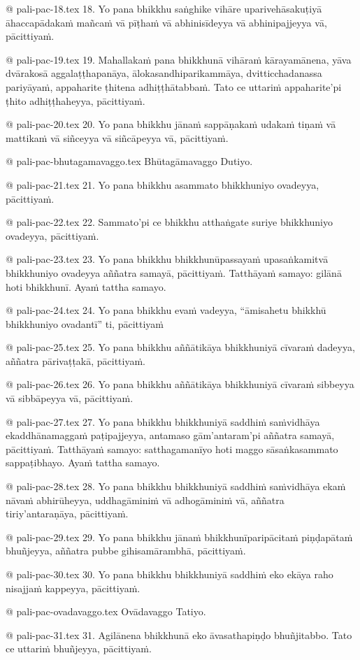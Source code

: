 @ pali-pac-18.tex
18. Yo pana bhikkhu saṅghike vihāre uparivehāsakuṭiyā āhaccapādakaṁ mañcaṁ vā pīṭhaṁ vā abhinisīdeyya vā abhinipajjeyya vā, pācittiyaṁ.

@ pali-pac-19.tex
19. Mahallakaṁ pana bhikkhunā vihāraṁ kārayamānena, yāva dvārakosā aggalaṭṭhapanāya, ālokasandhiparikammāya, dvitticchadanassa pariyāyaṁ, appaharite ṭhitena adhiṭṭhātabbaṁ. Tato ce uttariṁ appaharite’pi ṭhito adhiṭṭhaheyya, pācittiyaṁ.

@ pali-pac-20.tex
20. Yo pana bhikkhu jānaṁ sappāṇakaṁ udakaṁ tiṇaṁ vā mattikaṁ vā siñceyya vā siñcāpeyya vā, pācittiyaṁ.

@ pali-pac-bhutagamavaggo.tex
Bhūtagāmavaggo Dutiyo.

@ pali-pac-21.tex
21. Yo pana bhikkhu asammato bhikkhuniyo ovadeyya, pācittiyaṁ.

@ pali-pac-22.tex
22. Sammato’pi ce bhikkhu atthaṅgate suriye bhikkhuniyo ovadeyya, pācittiyaṁ.

@ pali-pac-23.tex
23. Yo pana bhikkhu bhikkhunūpassayaṁ upasaṅkamitvā bhikkhuniyo ovadeyya aññatra samayā, pācittiyaṁ. Tatthāyaṁ samayo: gilānā hoti bhikkhunī. Ayaṁ tattha samayo.

@ pali-pac-24.tex
24. Yo pana bhikkhu evaṁ vadeyya, “āmisahetu bhikkhū bhikkhuniyo ovadantī” ti, pācittiyaṁ

@ pali-pac-25.tex
25. Yo pana bhikkhu aññātikāya bhikkhuniyā cīvaraṁ dadeyya, aññatra pārivaṭṭakā, pācittiyaṁ.

@ pali-pac-26.tex
26. Yo pana bhikkhu aññātikāya bhikkhuniyā cīvaraṁ sibbeyya vā sibbāpeyya vā, pācittiyaṁ.

@ pali-pac-27.tex
27. Yo pana bhikkhu bhikkhuniyā saddhiṁ saṁvidhāya ekaddhānamaggaṁ paṭipajjeyya, antamaso gām’antaram’pi aññatra samayā, pācittiyaṁ. Tatthāyaṁ samayo: satthagamanīyo hoti maggo sāsaṅkasammato sappaṭibhayo. Ayaṁ tattha samayo.

@ pali-pac-28.tex
28. Yo pana bhikkhu bhikkhuniyā saddhiṁ saṁvidhāya ekaṁ nāvaṁ abhirūheyya, uddhagāminiṁ vā adhogāminiṁ vā, aññatra tiriy’antaraṇāya, pācittiyaṁ.

@ pali-pac-29.tex
29. Yo pana bhikkhu jānaṁ bhikkhunīparipācitaṁ piṇḍapātaṁ bhuñjeyya, aññatra pubbe gihisamārambhā, pācittiyaṁ.

@ pali-pac-30.tex
30. Yo pana bhikkhu bhikkhuniyā saddhiṁ eko ekāya raho nisajjaṁ kappeyya, pācittiyaṁ.

@ pali-pac-ovadavaggo.tex
Ovādavaggo Tatiyo.

@ pali-pac-31.tex
31. Agilānena bhikkhunā eko āvasathapiṇḍo bhuñjitabbo. Tato ce uttariṁ bhuñjeyya, pācittiyaṁ.

